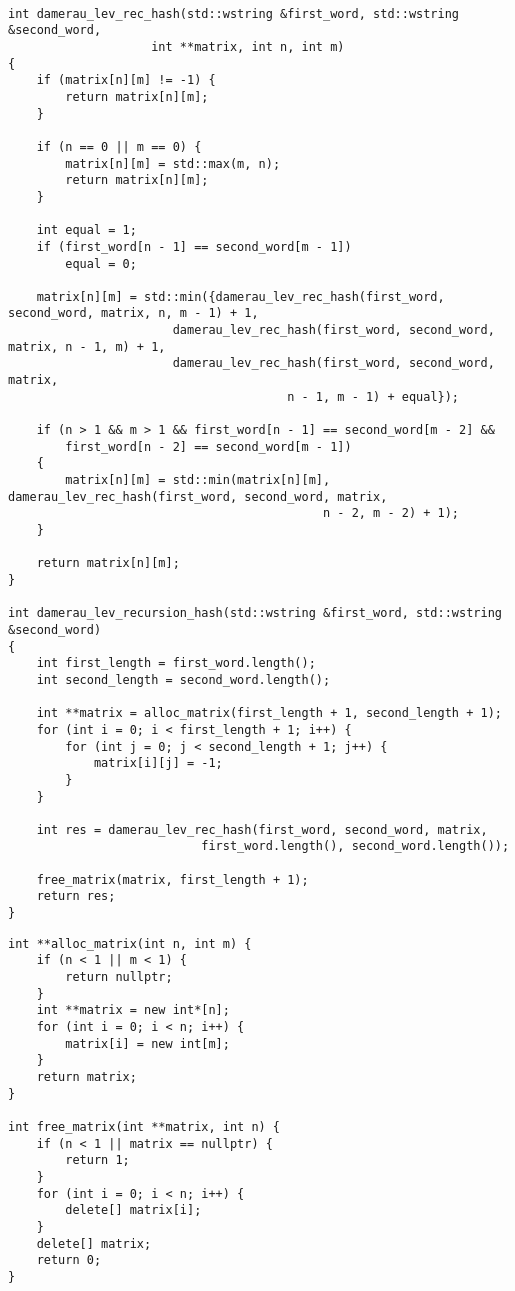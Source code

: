 \begin{lstlisting}[label=lst:dameray_lev_rec_hash,caption=Функция нахождения расстояния Дамерау-Левенштейна рекурсивно c кешированием]

int damerau_lev_rec_hash(std::wstring &first_word, std::wstring &second_word,
                    int **matrix, int n, int m)
{
    if (matrix[n][m] != -1) {
        return matrix[n][m];
    }

    if (n == 0 || m == 0) {
        matrix[n][m] = std::max(m, n);
        return matrix[n][m];
    }

    int equal = 1;
    if (first_word[n - 1] == second_word[m - 1])
        equal = 0;

    matrix[n][m] = std::min({damerau_lev_rec_hash(first_word, second_word, matrix, n, m - 1) + 1,
                       damerau_lev_rec_hash(first_word, second_word, matrix, n - 1, m) + 1,
                       damerau_lev_rec_hash(first_word, second_word, matrix,
                                       n - 1, m - 1) + equal});

    if (n > 1 && m > 1 && first_word[n - 1] == second_word[m - 2] &&
        first_word[n - 2] == second_word[m - 1])
    {
        matrix[n][m] = std::min(matrix[n][m], damerau_lev_rec_hash(first_word, second_word, matrix,
                                            n - 2, m - 2) + 1);
    }

    return matrix[n][m];
}

int damerau_lev_recursion_hash(std::wstring &first_word, std::wstring &second_word)
{
    int first_length = first_word.length();
    int second_length = second_word.length();

    int **matrix = alloc_matrix(first_length + 1, second_length + 1);
    for (int i = 0; i < first_length + 1; i++) {
        for (int j = 0; j < second_length + 1; j++) {
            matrix[i][j] = -1;
        }
    }

    int res = damerau_lev_rec_hash(first_word, second_word, matrix,
                           first_word.length(), second_word.length());

    free_matrix(matrix, first_length + 1);
    return res;
}

\end{lstlisting}

\clearpage

\begin{lstlisting}[label=lst:allocate_mtr,caption=Функции динамического выделения и очищения памяти под матрицу]
int **alloc_matrix(int n, int m) {
    if (n < 1 || m < 1) {
        return nullptr;
    }
    int **matrix = new int*[n];
    for (int i = 0; i < n; i++) {
        matrix[i] = new int[m];
    }
    return matrix;
}

int free_matrix(int **matrix, int n) {
    if (n < 1 || matrix == nullptr) {
        return 1;
    }
    for (int i = 0; i < n; i++) {
        delete[] matrix[i];
    }
    delete[] matrix;
    return 0;
}
\end{lstlisting}


